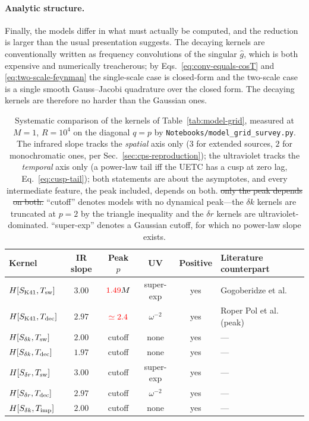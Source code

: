 \documentclass[10pt,prd,aps,nobibnotes,superscriptaddress,preprintnumbers,notitlepage]{revtex4-1}
\newif\ifconcise\concisefalse
\newcommand{\add}[1]{{\color{red}#1}}
\newcommand{\del}[1]{{\color{red}\sout{#1}}}
\newcommand{\add}[1]{#1}
\newcommand{\del}[1]{}
\begin{document}
\paragraph{Analytic structure.} Finally, the models differ in what must actually
be computed, and the reduction is larger than the usual presentation suggests.
The decaying kernels are conventionally written as frequency convolutions of the
singular $\hat g$, which is both expensive and numerically treacherous; by
Eqs.~\eqref{eq:conv-equals-cosT} and \eqref{eq:two-scale-feynman} the
single-scale case is closed-form and the two-scale case is a single smooth
Gauss--Jacobi quadrature over the closed form. The decaying kernels are
therefore no harder than the Gaussian ones.

\begin{table}[ht]
  \centering
  \begin{tabular}{lccccl}
  \hline
  Kernel & IR slope & Peak $p$ & UV & Positive & Literature counterpart \\
  \hline
  $H[S_{\rm K41},T_{\rm sw}]$   & $3.00$ & $\add{1.49}M$ & super-exp & yes & Gogoberidze et al.~\cite{Gogoberidze:2007an} \\
  $H[S_{\rm K41},T_{\rm dec}]$  & $2.97$ & $\add{\simeq2.4}$ & $\omega^{-2}$ & yes & Roper Pol et al.~\cite{RoperPol:2019wvy} (peak) \\
  $H[S_{\delta k},T_{\rm sw}]$  & $2.00$ & cutoff & none & yes & --- \\
  $H[S_{\delta k},T_{\rm dec}]$ & $1.97$ & cutoff & none & yes & --- \\
  $H[S_{\delta r},T_{\rm sw}]$  & $3.00$ & cutoff & super-exp & yes & --- \\
  $H[S_{\delta r},T_{\rm dec}]$ & $2.97$ & cutoff & $\omega^{-2}$ & yes & --- \\
  $H[S_{\delta k},T_{\rm imp}]$ & $2.00$ & cutoff & none & yes & --- \\
  \hline
  \end{tabular}
  \caption{Systematic comparison of the kernels of Table~\ref{tab:model-grid},
  measured at $M=1$, $R=10^{4}$ on the diagonal $q=p$ by
  \texttt{Notebooks/model\_grid\_survey.py}. The infrared slope tracks the
  \emph{spatial} axis only ($3$ for extended sources, $2$ for monochromatic
  ones, per Sec.~\ref{sec:cps-reproduction}); the ultraviolet tracks the
  \emph{temporal} axis only (a power-law tail iff the UETC has a cusp at zero
  lag, Eq.~\eqref{eq:cusp-tail}); \add{both statements are about the asymptotes, and
  every intermediate feature, the peak included, depends on both}.
  \del{only the peak depends on both.} ``cutoff''
  denotes models with no dynamical peak---the $\delta k$ kernels are truncated
  at $p=2$ by the triangle inequality and the $\delta r$ kernels are
  ultraviolet-dominated. ``super-exp'' denotes a Gaussian cutoff, for which no
  power-law slope exists.}
  \label{tab:model-differences}
\end{table}
\ifconcise\else  %
\end{document}
